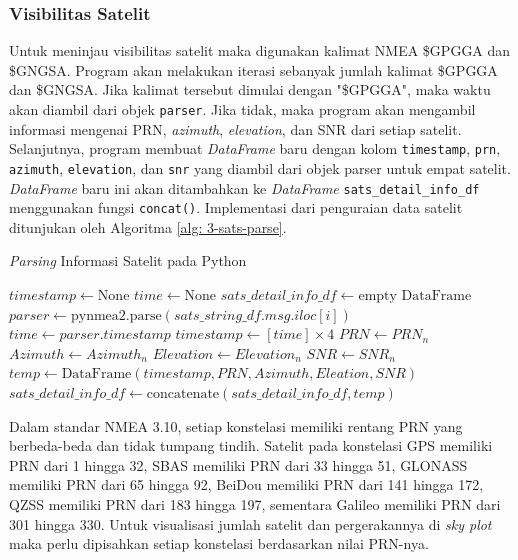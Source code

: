 \subsubsection{Visibilitas Satelit}
Untuk meninjau visibilitas satelit maka digunakan kalimat NMEA \$GPGGA dan \$GNGSA. Program akan melakukan iterasi sebanyak jumlah kalimat \$GPGGA dan \$GNGSA. Jika kalimat tersebut dimulai dengan "\$GPGGA", maka waktu akan diambil dari objek \texttt{parser}. Jika tidak, maka program akan mengambil informasi mengenai PRN, \textit{azimuth}, \textit{elevation}, dan SNR dari setiap satelit. Selanjutnya, program membuat \textit{DataFrame} baru dengan kolom \texttt{timestamp}, \texttt{prn}, \texttt{azimuth}, \texttt{elevation}, dan \texttt{snr} yang diambil dari objek parser untuk empat satelit. \textit{DataFrame} baru ini akan ditambahkan ke \textit{DataFrame} \texttt{sats\_detail\_info\_df} menggunakan fungsi \texttt{concat()}. Implementasi dari penguraian data satelit ditunjukan oleh Algoritma \ref{alg: 3-sats-parse}.

\begin{algorithm}[H]
	\caption{\textit{Parsing} Informasi Satelit pada Python}
	\label{alg: 3-sats-parse}
	\begin{algorithmic}[1]
	\State $timestamp \gets \text{None}$
	\State $time \gets \text{None}$
	\State $sats\_detail\_info\_df \gets \text{empty DataFrame}$
	\\
		\State $parser \gets \text{pynmea2.parse}(sats\_string\_df.msg.iloc[i])$
		\State $time \gets parser.timestamp$
		\Else
		\State $timestamp \gets [time] \times 4$
		\EndIf
		\State $PRN \gets PRN_n$
		\State $Azimuth \gets Azimuth_n$
		\State $Elevation \gets Elevation_n$
		\State $SNR \gets SNR_n$
		\State $temp \gets \text{DataFrame}({timestamp, PRN, Azimuth, Eleation, SNR})$
		\State $sats\_detail\_info\_df \gets \text{concatenate}(sats\_detail\_info\_df, temp)$
		\EndIf
	\EndFor
	\end{algorithmic}
\end{algorithm}
	
Dalam standar NMEA 3.10, setiap konstelasi memiliki rentang PRN yang berbeda-beda dan tidak tumpang tindih. Satelit pada konstelasi GPS memiliki PRN dari 1 hingga 32, SBAS memiliki PRN dari 33 hingga 51, GLONASS memiliki PRN dari 65 hingga 92, BeiDou memiliki PRN dari 141 hingga 172, QZSS memiliki PRN dari 183 hingga 197, sementara Galileo memiliki PRN dari 301 hingga 330. Untuk visualisasi jumlah satelit dan pergerakannya di \textit{sky plot} maka perlu dipisahkan setiap konstelasi berdasarkan nilai PRN-nya.

